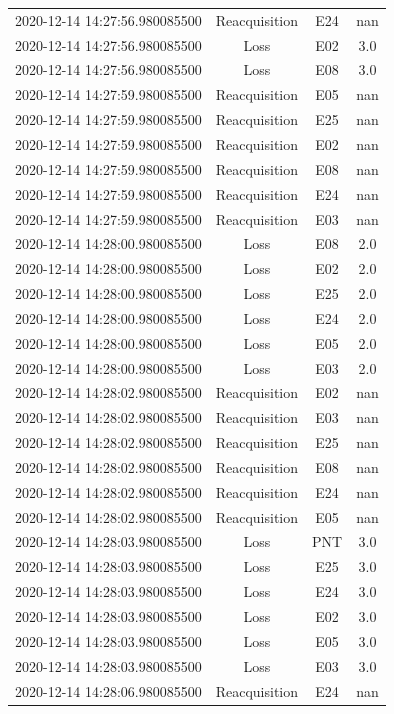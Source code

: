 \begin{enumerate}
\begin{longtabu}{cccc}
2020{-}12{-}14 14:27:56.980085500&Reacquisition&E24&nan\\%
2020{-}12{-}14 14:27:56.980085500&Loss&E02&3.0\\%
2020{-}12{-}14 14:27:56.980085500&Loss&E08&3.0\\%
2020{-}12{-}14 14:27:59.980085500&Reacquisition&E05&nan\\%
2020{-}12{-}14 14:27:59.980085500&Reacquisition&E25&nan\\%
2020{-}12{-}14 14:27:59.980085500&Reacquisition&E02&nan\\%
2020{-}12{-}14 14:27:59.980085500&Reacquisition&E08&nan\\%
2020{-}12{-}14 14:27:59.980085500&Reacquisition&E24&nan\\%
2020{-}12{-}14 14:27:59.980085500&Reacquisition&E03&nan\\%
2020{-}12{-}14 14:28:00.980085500&Loss&E08&2.0\\%
2020{-}12{-}14 14:28:00.980085500&Loss&E02&2.0\\%
2020{-}12{-}14 14:28:00.980085500&Loss&E25&2.0\\%
2020{-}12{-}14 14:28:00.980085500&Loss&E24&2.0\\%
2020{-}12{-}14 14:28:00.980085500&Loss&E05&2.0\\%
2020{-}12{-}14 14:28:00.980085500&Loss&E03&2.0\\%
2020{-}12{-}14 14:28:02.980085500&Reacquisition&E02&nan\\%
2020{-}12{-}14 14:28:02.980085500&Reacquisition&E03&nan\\%
2020{-}12{-}14 14:28:02.980085500&Reacquisition&E25&nan\\%
2020{-}12{-}14 14:28:02.980085500&Reacquisition&E08&nan\\%
2020{-}12{-}14 14:28:02.980085500&Reacquisition&E24&nan\\%
2020{-}12{-}14 14:28:02.980085500&Reacquisition&E05&nan\\%
2020{-}12{-}14 14:28:03.980085500&Loss&PNT&3.0\\%
2020{-}12{-}14 14:28:03.980085500&Loss&E25&3.0\\%
2020{-}12{-}14 14:28:03.980085500&Loss&E24&3.0\\%
2020{-}12{-}14 14:28:03.980085500&Loss&E02&3.0\\%
2020{-}12{-}14 14:28:03.980085500&Loss&E05&3.0\\%
2020{-}12{-}14 14:28:03.980085500&Loss&E03&3.0\\%
2020{-}12{-}14 14:28:06.980085500&Reacquisition&E24&nan\\%

\end{longtabu}
\end{enumerate}
